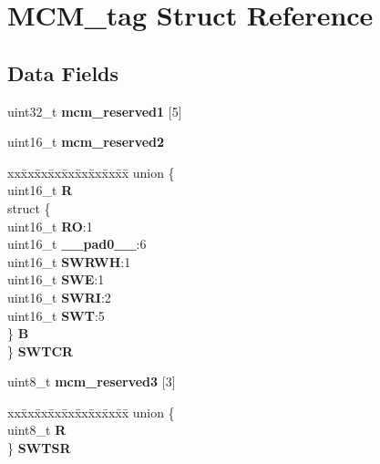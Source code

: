 \hypertarget{structMCM__tag}{}\section{M\+C\+M\+\_\+tag Struct Reference}
\label{structMCM__tag}
\subsection*{Data Fields}
\begin{DoxyCompactItemize}
\item 
\mbox{\label{structMCM__tag_a849e1bf0474c7ac2236d084adf8fd234}} 
uint32\+\_\+t {\bfseries mcm\+\_\+reserved1} \mbox{[}5\mbox{]}
\item 
\mbox{\label{structMCM__tag_ab2c186d8bd5297c5d2c017929b8be9aa}} 
uint16\+\_\+t {\bfseries mcm\+\_\+reserved2}
\item 
\mbox{\label{structMCM__tag_a8533482099b4318993c86da021a5d17f}} 
\begin{tabbing}
xx\=xx\=xx\=xx\=xx\=xx\=xx\=xx\=xx\=\kill
union \{\\
\>uint16\_t {\bfseries R}\\
\>struct \{\\
\>\>uint16\_t {\bfseries RO}:1\\
\>\>uint16\_t {\bfseries \_\_pad0\_\_}:6\\
\>\>uint16\_t {\bfseries SWRWH}:1\\
\>\>uint16\_t {\bfseries SWE}:1\\
\>\>uint16\_t {\bfseries SWRI}:2\\
\>\>uint16\_t {\bfseries SWT}:5\\
\>\} {\bfseries B}\\
\} {\bfseries SWTCR}\\

\end{tabbing}\item 
\mbox{\label{structMCM__tag_a57ec27f523f91c9a3cf88723c266a5dc}} 
uint8\+\_\+t {\bfseries mcm\+\_\+reserved3} \mbox{[}3\mbox{]}
\item 
\mbox{\label{structMCM__tag_ae811fe1dd66b8f07c25e9f0227cdd89a}} 
\begin{tabbing}
xx\=xx\=xx\=xx\=xx\=xx\=xx\=xx\=xx\=\kill
union \{\\
\>uint8\_t {\bfseries R}\\
\} {\bfseries SWTSR}\\


\end{tabbing}
\end{DoxyCompactItemize}
